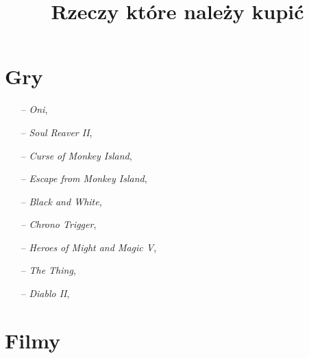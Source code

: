 \documentclass[a4paper,11pt]{article}
\title{Rzeczy które należy kupić}
\begin{document}





\maketitle %





\section{Gry}


\begin{itemize}
\item[--] \textit{Oni},

\item[--] \textit{Soul Reaver II},

\item[--] \textit{Curse of Monkey Island},

\item[--] \textit{Escape from Monkey Island},

\item[--] \textit{Black and White},

\item[--] \textit{Chrono Trigger},

\item[--] \textit{Heroes of Might and Magic V},

\item[--] \textit{The Thing},

\item[--] \textit{Diablo II},

\end{itemize}










\section{Filmy}
\end{document}
